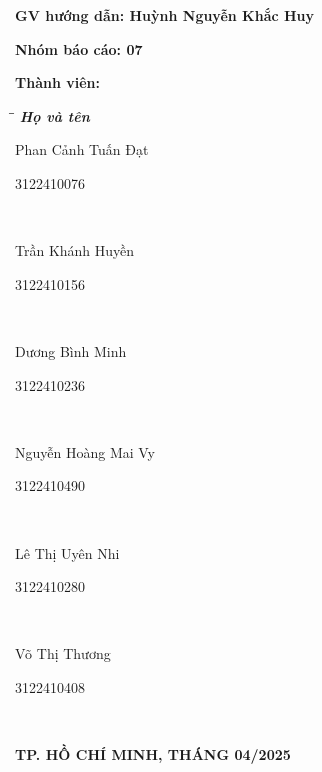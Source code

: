\documentclass[a4paper,12pt]{report}
\begin{document}
\begin{titlepage}
    \vspace{15pt}
    \textbf{GV hướng dẫn: Huỳnh Nguyễn Khắc Huy}

    \vspace{10pt}
    \textbf{Nhóm báo cáo: 07}

    \vspace{10pt}
    \textbf{Thành viên:}
    \begin{center}
        
    \end{center}
    \begin{tabbing}
        \hspace{8cm}\=\hspace{3cm}\=\hspace{3cm} \kill
        {\it \textbf{Họ và tên}}\\
        \begin{bfseries}Phan Cảnh Tuấn Đạt\end{bfseries}\> \begin{bfseries}3122410076\end{bfseries}\\
        \begin{bfseries}Trần Khánh Huyền\end{bfseries}\> \begin{bfseries}3122410156\end{bfseries}\\
        \begin{bfseries}Dương Bình Minh\end{bfseries}\> \begin{bfseries}3122410236\end{bfseries}\\
        \begin{bfseries}Nguyễn Hoàng Mai Vy\end{bfseries}\> \begin{bfseries}3122410490\end{bfseries}\\
        \begin{bfseries}Lê Thị Uyên Nhi\end{bfseries}\> \begin{bfseries}3122410280\end{bfseries}\\
        \begin{bfseries}Võ Thị Thương\end{bfseries}\> \begin{bfseries}3122410408\end{bfseries}\\

    \end{tabbing}
    \vspace{10pt}
    \begin{center}
        \textbf{TP. HỒ CHÍ MINH, THÁNG 04/2025}
    \end{center}
\end{titlepage}
\end{document}
